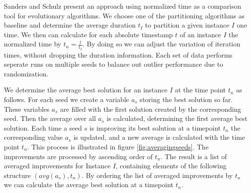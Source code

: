 \documentclass[a4paper,12pt,titlepage, BCOR7mm,headsepline]{scrbook}
\numberwithin{equation}{section}
\begin{document}
% 
Sanders and Schulz \cite{sanders2012distributed} present an approach using normalized time as a comparison tool for evolutionary algorithms. We choose one of the partitioning algorithms as baseline and determine the average duration $t_I$ to partition a given instance $I$ one time. We then can calculate for each absolute timestamp $t$ of an instance $I$ the normalized time by $t_n = \frac{t}{t_I}$. By doing so we can adjust the variation of iteration times, without dropping the duration information. 
Each set of data performs seperate runs on multiple seeds to balance out outlier performance due to randomization.

We determine the average best solution for an instance $I$ at the time point $t_n$ as follows. For each seed we create a variable $a_s$ storing the best solution so far. These variables $a_s$ are filled with the first solution created by the corresponding seed. Then the average over all $a_s$ is calculated, determining the first average best solution. Each time a seed $s$ is improving its best solution at a timepoint $t_n$ the corresponding value $a_s$ is updated, and a new average is calculated with the time point $t_n$. This process is illustrated in figure \ref{fig:averagingseeds}. The improvements are processed by ascending order of $t_n$. The result is a list of averaged improvements for Instance $I$, containing elements of the following structure $(avg(a_s), t_n)$. By ordering the list of averaged improvements by $t_n$ we can calculate the average best solution at a timepoint $t_n$.
\end{document}
